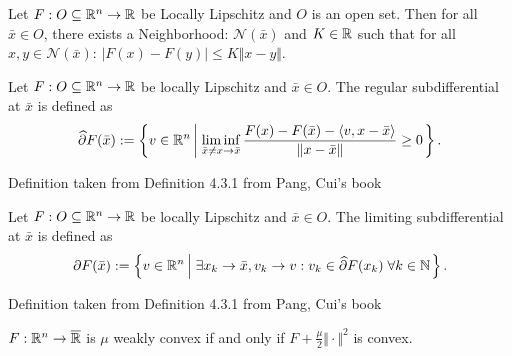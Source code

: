 \documentclass[12pt]{article}
\begin{document}
        \begin{definition}
            Let $F: O \subseteq \mathbb R^n \rightarrow \mathbb R$ be Locally Lipschitz and $O$ is an open set. 
            Then for all $\bar x \in O$, there exists a Neighborhood: $\mathcal N(\bar x)$ and $K \in \mathbb R$ such that for all $x, y \in \mathcal N(\bar x)$: $|F(x) - F(y)| \le K \Vert x - y\Vert$. 
        \end{definition}
        \begin{definition}
            Let $F: O \subseteq \mathbb R^n \rightarrow \mathbb R$ be locally Lipschitz and $\bar x \in O$. 
            The regular subdifferential at $\bar x$ is defined as 
            \begin{align*}
                \widehat \partial F(\bar x) := 
                \left\lbrace
                    v \in \mathbb R^n \left| \; 
                        \liminf_{\bar x \neq x\rightarrow \bar x}
                        \frac{F(x) - F(\bar x) - \langle v, x - \bar x\rangle}{\Vert x - \bar x\Vert} 
                        \ge 0
                    \right.
                \right\rbrace. 
            \end{align*}
        \end{definition}
        \begin{remark}
            Definition taken from Definition 4.3.1 from 
            Pang, Cui's book \cite{ying_modern_2021}
        \end{remark}
        \begin{definition}
            Let $F: O \subseteq \mathbb R^n \rightarrow \mathbb R$ be locally Lipschitz and $\bar x \in O$. 
            The limiting subdifferential at $\bar x$ is defined as 
            \begin{align*}
                \partial F(\bar x) := 
                \left\lbrace
                    v \in \mathbb R^n \left| \; 
                        \exists x_k \rightarrow \bar x, v_k \rightarrow v: 
                        v_k \in \widehat \partial F(x_k) \;\forall k \in \mathbb N
                    \right.
                \right\rbrace. 
            \end{align*}
        \end{definition}
        \begin{remark}
            Definition taken from Definition 4.3.1 from
            Pang, Cui's book \cite{ying_modern_2021}
        \end{remark}
        \begin{definition}
            $F: \mathbb R^n \rightarrow \overline {\mathbb R}$ is $\mu$ weakly convex if and only if $F + \frac{\mu}{2}\Vert \cdot\Vert^2$ is convex. 
        \end{definition}
\end{document}
